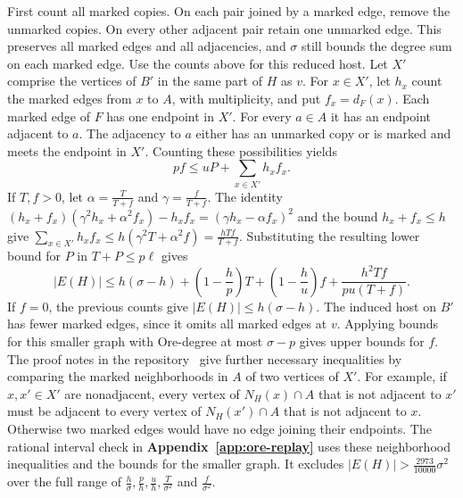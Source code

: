 First count all marked copies. On each pair joined by a marked
edge, remove the unmarked copies. On every other adjacent pair
retain one unmarked edge. This preserves all marked edges and all
adjacencies, and $\sigma$ still bounds the degree sum on each marked
edge. Use the counts above for this reduced host. Let $X'$ comprise the vertices of
$B'$ in the same part of $H$ as $v$. For $x\in X'$, let $h_x$
count the marked edges from $x$ to $A$, with multiplicity, and put
$f_x=d_F(x)$.
Each marked edge of $F$ has one endpoint in $X'$. For every
$a\in A$ it has an endpoint adjacent to $a$. The adjacency to $a$
either has an unmarked copy or is marked and meets the endpoint
in $X'$. Counting these possibilities yields
\[
 pf\leq uP+\sum_{x\in X'} h_xf_x .
\]
If $T,f>0$, let $\alpha=\frac{T}{T+f}$ and $\gamma=\frac{f}{T+f}$.
The identity
$(h_x+f_x)(\gamma^2h_x+\alpha^2 f_x)-h_x f_x
=(\gamma h_x-\alpha f_x)^2$ and the bound $h_x+f_x\leq h$
give $\sum_{x\in X'} h_xf_x\leq h(\gamma^2T+\alpha^2 f)
=\frac{hTf}{T+f}$. Substituting the resulting lower bound for
$P$ in $T+P\leq p\ell$ gives
\[
 |E(H)|\leq h(\sigma-h)+\left(1-\frac hp\right)T
       +\left(1-\frac hu\right)f
       +\frac{h^2Tf}{pu(T+f)} .
\]
If $f=0$, the previous counts give $|E(H)|\leq h(\sigma-h)$.
The induced host on $B'$ has fewer marked edges, since it omits
all marked edges at $v$. Applying bounds for this smaller graph with
Ore-degree at most $\sigma-p$ gives upper bounds for $f$.
The proof notes in the repository~\cite{FGSTCode} give further necessary
inequalities by comparing the marked neighborhoods in $A$ of
two vertices of $X'$. For example, if $x,x'\in X'$ are nonadjacent,
every vertex of $N_H(x)\cap A$ that is not adjacent to $x'$ must
be adjacent to every vertex of $N_H(x')\cap A$ that is not adjacent
to $x$. Otherwise two marked edges would have no edge joining their
endpoints. The rational interval check in \textbf{Appendix~\ref{app:ore-replay}}
uses these neighborhood inequalities and the bounds for the smaller
graph. It excludes $|E(H)|>\frac{2973}{10000}\sigma^2$ over the full
range of $\frac{h}{\sigma},\frac ph,\frac uh,\frac{T}{\sigma^2}$
and $\frac{f}{\sigma^2}$.

